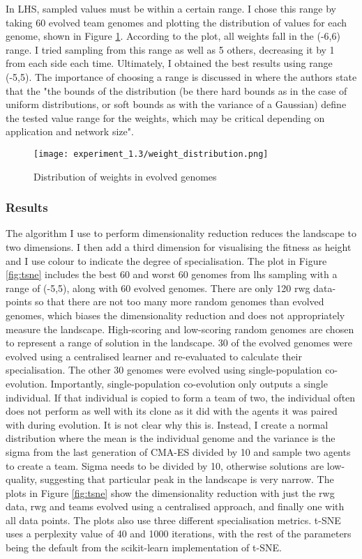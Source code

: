 \documentclass[12pt]{article}
\begin{document}
In LHS, sampled values must be within a certain range.
I chose this range by taking 60 evolved team genomes and plotting the distribution of values for each genome, shown in Figure \ref{fig:weight_distribution}.
According to the plot, all weights fall in the (-6,6) range.
I tried sampling from this range as well as 5 others, decreasing it by 1 from each side each time. 
Ultimately, I obtained the best results using range (-5,5).
The importance of choosing a range is discussed in \cite{oller:AAMAS:2020} where the authors state that the "the bounds of the distribution (be there hard bounds as in the case of uniform distributions, or soft bounds as with the variance of a Gaussian) define the tested value range for the weights, which may be critical depending on application and network size". 

\begin{figure}[h]
\centering
\texttt{[image: experiment\_1.3/weight\_distribution.png]}
\caption{Distribution of weights in evolved genomes}
\label{fig:weight_distribution}
\end{figure}

\subsubsection{Results}

The algorithm I use to perform dimensionality reduction reduces the landscape to two dimensions.
I then add a third dimension for visualising the fitness as height and I use colour to indicate the degree of specialisation.
The plot in Figure \ref{fig:tsne} includes the best 60 and worst 60 genomes from lhs sampling with a range of (-5,5), along with 60 evolved genomes.
There are only 120 rwg data-points so that there are not too many more random genomes than evolved genomes, which biases the dimensionality reduction and does not appropriately measure the landscape.
High-scoring and low-scoring random genomes are chosen to represent a range of solution in the landscape.
30 of the evolved genomes were evolved using a centralised learner and re-evaluated to calculate their specialisation.
The other 30 genomes were evolved using single-population co-evolution.
Importantly, single-population co-evolution only outputs a single individual.
If that individual is copied to form a team of two, the individual often does not perform as well with its clone as it did with the agents it was paired with during evolution.
It is not clear why this is.
Instead, I create a normal distribution where the mean is the individual genome and the variance is the sigma from the last generation of CMA-ES divided by 10 and sample two agents to create a team.
Sigma needs to be divided by 10, otherwise solutions are low-quality, suggesting that particular peak in the landscape is very narrow.
The plots in Figure \ref{fig:tsne} show the dimensionality reduction with just the rwg data, rwg and teams evolved using a centralised approach, and finally one with all data points.
The plots also use three different specialisation metrics.
t-SNE uses a perplexity value of 40 and 1000 iterations, with the rest of the parameters being the default from the scikit-learn implementation of t-SNE.\\
\end{document}
